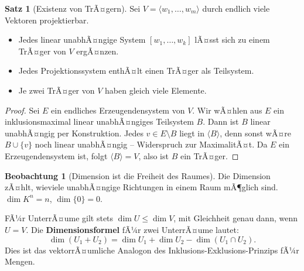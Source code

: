 ﻿\documentclass[a4paper,12pt]{report}
\theoremstyle{definition}
\newtheorem{satz}{Satz}
\newtheorem{beobachtung}{Beobachtung}
\begin{document}
\begin{satz}[Existenz von TrÃ¤gern]
    Sei $V = \langle w_1, \dots, w_m \rangle$ durch endlich viele Vektoren
    projektierbar.
    \begin{itemize}
        \item[-] Jedes linear unabhÃ¤ngige System $[w_1, \dots, w_k]$ lÃ¤sst sich
              zu einem TrÃ¤ger von $V$ ergÃ¤nzen.
        \item[-] Jedes Projektionssystem enthÃ¤lt einen TrÃ¤ger als Teilsystem.
        \item[-] Je zwei TrÃ¤ger von $V$ haben gleich viele Elemente.
    \end{itemize}
\end{satz}
\begin{proof}
    Sei $E$ ein endliches Erzeugendensystem von $V$. Wir wÃ¤hlen aus $E$
    ein inklusionsmaximal linear unabhÃ¤ngiges Teilsystem $B$. Dann ist
    $B$ linear unabhÃ¤ngig per Konstruktion. Jedes $v \in E \setminus B$
    liegt in $\langle B \rangle$, denn sonst wÃ¤re $B \cup \{v\}$ noch linear
    unabhÃ¤ngig -- Widerspruch zur MaximalitÃ¤t. Da $E$ ein Erzeugendensystem ist,
    folgt $\langle B \rangle = V$, also ist $B$ ein TrÃ¤ger.
\end{proof}


\begin{beobachtung}[Dimension ist die Freiheit des Raumes]
    Die Dimension zÃ¤hlt, wieviele unabhÃ¤ngige Richtungen in einem Raum
    mÃ¶glich sind. $\dim K^n = n$, $\dim \{0\} = 0$.

    FÃ¼r UnterrÃ¤ume gilt stets $\dim U \le \dim V$, mit Gleichheit genau
    dann, wenn $U = V$. Die \textbf{Dimensionsformel} fÃ¼r zwei UnterrÃ¤ume
    lautet:
    \[
        \dim(U_1 + U_2) = \dim U_1 + \dim U_2 - \dim(U_1 \cap U_2).
    \]
    Dies ist das vektorrÃ¤umliche Analogon des Inklusions-Exklusions-Prinzips
    fÃ¼r Mengen.
\end{beobachtung}
\end{document}

